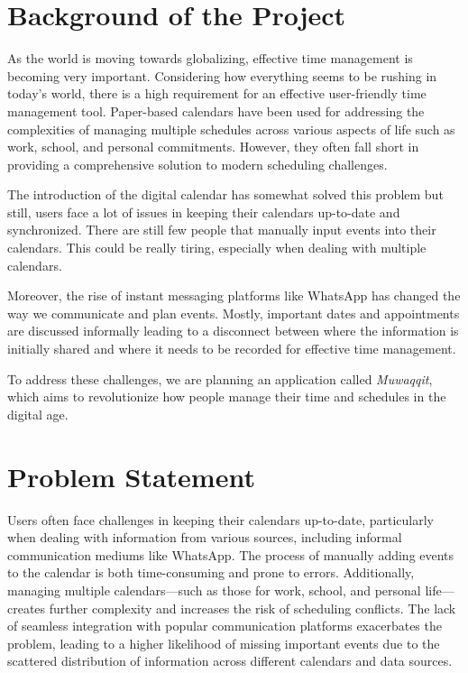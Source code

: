 \documentclass[12pt,a4paper]{article}
\begin{document}
\tableofcontents
\clearpage

\doublespacing

\section{Background of the Project}

As the world is moving towards globalizing, effective time management is becoming very important. Considering how everything seems to be rushing in today's world, there is a high requirement for an effective user-friendly time management tool. Paper-based calendars have been used for addressing the complexities of managing multiple schedules across various aspects of life such as work, school, and personal commitments. However, they often fall short in providing a comprehensive solution to modern scheduling challenges.

The introduction of the digital calendar has somewhat solved this problem but still, users face a lot of issues in keeping their calendars up-to-date and synchronized. There are still few people that manually input events into their calendars. This could be really tiring, especially when dealing with multiple calendars.

Moreover, the rise of instant messaging platforms like WhatsApp has changed the way we communicate and plan events. Mostly, important dates and appointments are discussed informally leading to a disconnect between where the information is initially shared and where it needs to be recorded for effective time management.

To address these challenges, we are planning an application called \textit{Muwaqqit}, which aims to revolutionize how people manage their time and schedules in the digital age.

\section{Problem Statement}

Users often face challenges in keeping their calendars up-to-date, particularly when dealing with information from various sources, including informal communication mediums like WhatsApp. The process of manually adding events to the calendar is both time-consuming and prone to errors. Additionally, managing multiple calendars—such as those for work, school, and personal life—creates further complexity and increases the risk of scheduling conflicts. The lack of seamless integration with popular communication platforms exacerbates the problem, leading to a higher likelihood of missing important events due to the scattered distribution of information across different calendars and data sources.
\end{document}

